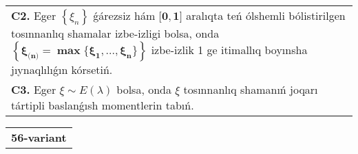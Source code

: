 \documentclass{article}
\begin{document}
\begin{tabular}{m{17cm}}
 \\
\textbf{C2.} Eger \(\left\{ \xi_{n} \right\}\) ǵárezsiz hám \(\mathbf{\lbrack 0,1\rbrack}\) aralıqta teń ólshemli bólistirilgen tosınnanlıq shamalar izbe-izligi bolsa, onda \(\left\{ \mathbf{\xi}_{\mathbf{(}\mathbf{n}\mathbf{)}}\mathbf{=}\mathbf{\max}\mathbf{\{}\mathbf{\xi}_{\mathbf{1}}\mathbf{,...,}\mathbf{\xi}_{\mathbf{n}}\mathbf{\}} \right\}\) izbe-izlik 1 ge itimallıq boyınsha jıynaqlılıǵın kórsetiń.
 \\
\textbf{C3.} Eger \(\xi\sim E(\lambda)\) bolsa, onda \(\xi\) tosınnanlıq shamanıń joqarı tártipli baslanǵısh momentlerin tabıń.
 \\

\end{tabular}
\vspace{1cm}


\begin{tabular}{m{17cm}}
\textbf{56-variant}
\newline


\end{tabular}
\end{document}
